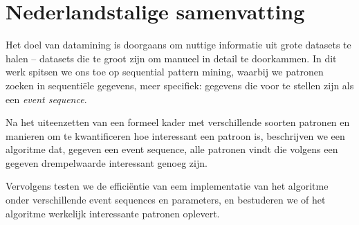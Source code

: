 \chapter{Nederlandstalige samenvatting}

Het doel van datamining is doorgaans om nuttige informatie uit grote datasets te halen -- datasets die te groot zijn om manueel in detail te doorkammen. In dit werk spitsen we ons toe op sequential pattern mining, waarbij we patronen zoeken in sequentiële gegevens, meer specifiek: gegevens die voor te stellen zijn als een \emph{event sequence}.

Na het uiteenzetten van een formeel kader met verschillende soorten patronen en manieren om te kwantificeren hoe interessant een patroon is, beschrijven we een algoritme dat, gegeven een event sequence, alle patronen vindt die volgens een gegeven drempelwaarde interessant genoeg zijn.

Vervolgens testen we de efficiëntie van eem implementatie van het algoritme onder verschillende event sequences en parameters, en bestuderen we of het algoritme werkelijk interessante patronen oplevert.
